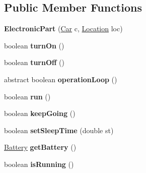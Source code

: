 \subsection*{Public Member Functions}
\begin{DoxyCompactItemize}
\item 
\hypertarget{classCars_1_1ElectronicPart_a476e83bd2cd79f0ebc7b3e9a73d53d39}{}{\bfseries Electronic\+Part} (\hyperlink{classCars_1_1Car}{Car} c, \hyperlink{enumEnums_1_1Location}{Location} loc)\label{classCars_1_1ElectronicPart_a476e83bd2cd79f0ebc7b3e9a73d53d39}

\item 
\hypertarget{classCars_1_1ElectronicPart_a1e10db7cf14215432b76ab9370c3a11f}{}boolean {\bfseries turn\+On} ()\label{classCars_1_1ElectronicPart_a1e10db7cf14215432b76ab9370c3a11f}

\item 
\hypertarget{classCars_1_1ElectronicPart_a244084d3e58c494fbbf3e466676b2450}{}boolean {\bfseries turn\+Off} ()\label{classCars_1_1ElectronicPart_a244084d3e58c494fbbf3e466676b2450}

\item 
\hypertarget{classCars_1_1ElectronicPart_a4dba4495835b001131f5c9fd668771eb}{}abstract boolean {\bfseries operation\+Loop} ()\label{classCars_1_1ElectronicPart_a4dba4495835b001131f5c9fd668771eb}

\item 
\hypertarget{classCars_1_1ElectronicPart_abc59a05d00c47fb2214e88b1491dae49}{}boolean {\bfseries run} ()\label{classCars_1_1ElectronicPart_abc59a05d00c47fb2214e88b1491dae49}

\item 
\hypertarget{classCars_1_1ElectronicPart_abb2d2e03e6c9d079df55ad1e044b76b6}{}boolean {\bfseries keep\+Going} ()\label{classCars_1_1ElectronicPart_abb2d2e03e6c9d079df55ad1e044b76b6}

\item 
\hypertarget{classCars_1_1ElectronicPart_acfb3683ac09bb6e7b75e2ad1bcdc3e97}{}boolean {\bfseries set\+Sleep\+Time} (double st)\label{classCars_1_1ElectronicPart_acfb3683ac09bb6e7b75e2ad1bcdc3e97}

\item 
\hypertarget{classCars_1_1ElectronicPart_aa4f963bfb8b24c1fe2caa9b80d21e459}{}\hyperlink{classElectricalParts_1_1Battery}{Battery} {\bfseries get\+Battery} ()\label{classCars_1_1ElectronicPart_aa4f963bfb8b24c1fe2caa9b80d21e459}

\item 
\hypertarget{classCars_1_1ElectronicPart_a0c0fc319a9e94daa997bcb0e4df401ee}{}boolean {\bfseries is\+Running} ()\label{classCars_1_1ElectronicPart_a0c0fc319a9e94daa997bcb0e4df401ee}

\end{DoxyCompactItemize}
